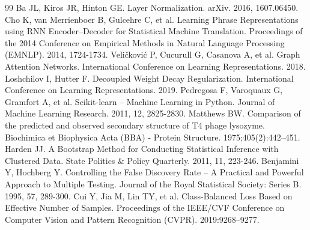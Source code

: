 \documentclass[unnumsec,webpdf,contemporary,large]{oup-authoring-template}
\begin{document}
\begin{thebibliography}{99}
Ba JL, Kiros JR, Hinton GE. Layer Normalization. arXiv. 2016, 1607.06450.
Cho K, van Merrienboer B, Gulcehre C, et al. Learning Phrase Representations using RNN Encoder--Decoder for Statistical Machine Translation. Proceedings of the 2014 Conference on Empirical Methods in Natural Language Processing (EMNLP). 2014, 1724-1734.
Veličković P, Cucurull G, Casanova A, et al. Graph Attention Networks. International Conference on Learning Representations. 2018.
Loshchilov I, Hutter F. Decoupled Weight Decay Regularization. International Conference on Learning Representations. 2019.
Pedregosa F, Varoquaux G, Gramfort A, et al. Scikit-learn -- Machine Learning in Python. Journal of Machine Learning Research. 2011, 12, 2825-2830.
Matthews BW. Comparison of the predicted and observed secondary structure of T4 phage lysozyme. Biochimica et Biophysica Acta (BBA) - Protein Structure. 1975;405(2):442--451.
Harden JJ. A Bootstrap Method for Conducting Statistical Inference with Clustered Data. State Politics \& Policy Quarterly. 2011, 11, 223-246.
Benjamini Y, Hochberg Y. Controlling the False Discovery Rate -- A Practical and Powerful Approach to Multiple Testing. Journal of the Royal Statistical Society: Series B. 1995, 57, 289-300.
Cui Y, Jia M, Lin TY, et al. Class-Balanced Loss Based on Effective Number of Samples. Proceedings of the IEEE/CVF Conference on Computer Vision and Pattern Recognition (CVPR). 2019:9268--9277.
\end{thebibliography}
\end{document}
